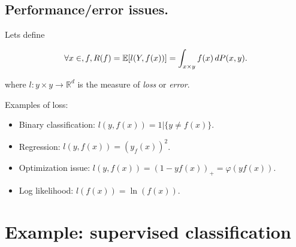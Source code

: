 		\subsection{Performance/error issues.}

			Lets define

			\[ \forall x \in, \mathnormal{f}, R(f)=\mathbb{E}[l(Y,f(x))] =  \int_{x{\times}y} f(x)\,dP(x,y).\] 

			where $l:y{\times}y \rightarrow \mathbb{R}^d$ is the measure of \emph{loss} or \emph{error}.
			
			Examples of loss:
					\begin{itemize}
							\item Binary classification: $l(y,f(x)) = 1|\{y \neq f(x)\}$.
							\item Regression: $l(y,f(x))=(y_f(x))^2$.
							\item Optimization issue: $l(y,f(x))=(1-yf(x))_+ = \varphi(yf(x))$.
							\item Log likelihood: $l(f(x))=\ln(f(x))$.
					\end{itemize}

	\section{Example: supervised classification}
